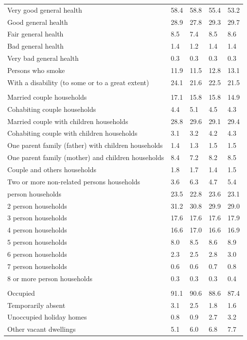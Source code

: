 \documentclass{article}
\begin{document}
\begin{table}[h]
\begin{tabular}{KTTTT}
    \hline
Very good general health & 58.4& 58.8&55.4& 53.2\\
Good general health & 28.9& 27.8& 29.3& 29.7\\
Fair general health & 8.5& 7.4&8.5& 8.6\\
Bad general health & 1.4& 1.2&1.4& 1.4\\
Very bad general health & 0.3& 0.3&0.3& 0.3\\
    \hline
Persons who smoke & 11.9& 11.5&12.8& 13.1\\
    \hline
With a disability (to some or to a great extent) & 24.1& 21.6&22.5& 21.5\\
\hline
    \\ 
    \hline
Married couple households & 17.1& 15.8& 15.8& 14.9\\
Cohabiting couple households & 4.4& 5.1& 4.5& 4.3\\
Married couple with children households & 28.8& 29.6& 29.1& 29.4\\
Cohabiting couple with children households & 3.1& 3.2& 4.2& 4.3\\
One parent family (father) with  children households & 1.4& 1.3& 1.5& 1.5\\
One parent family (mother) and children households & 8.4& 7.2& 8.2& 8.5\\
Couple and others households  & 1.8& 1.7& 1.4& 1.5\\
Two or more non-related persons households & 3.6& 6.3& 4.7& 5.4\\
     person households & 23.5& 22.8& 23.6& 23.1\\
2 person households & 31.2& 30.8& 29.9& 29.0\\
3 person households & 17.6& 17.6& 17.6& 17.9\\
4 person households & 16.6& 17.0& 16.6& 16.9\\
5 person households & 8.0& 8.5& 8.6& 8.9\\
6 person households & 2.3& 2.5& 2.8& 3.0\\
7 person households & 0.6& 0.6& 0.7& 0.8\\
8 or more person households & 0.3& 0.3& 0.3& 0.4\\
\hline
    \\ 
    \hline
Occupied & 91.1& 90.6& 88.6& 87.4\\
Temporarily absent & 3.1& 2.5& 1.8& 1.6\\
Unoccupied holiday homes & 0.8& 0.9& 2.7& 3.2\\
Other vacant dwellings & 5.1& 6.0& 6.8& 7.7\\
\hline
\end{tabular}
\end{table}
\end{document}
